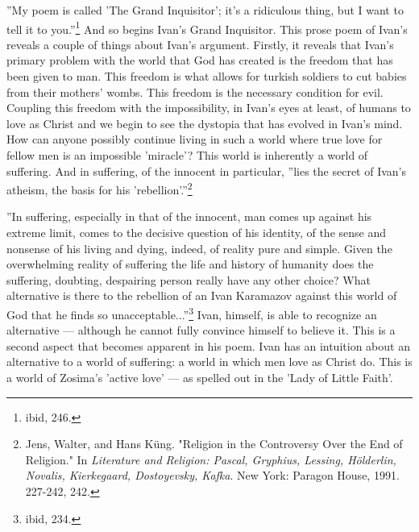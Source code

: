 ''My poem is called 'The Grand Inquisitor'; it's a ridiculous thing, but I want to tell it to you.''\footnote{ibid, 246.} And so begins Ivan's Grand Inquisitor. This prose poem of Ivan's reveals a couple of things about Ivan's argument. Firstly, it reveals that Ivan's primary problem with the world that God has created is the freedom that has been given to man. This freedom is what allows for turkish soldiers to cut babies from their mothers' wombs. This freedom is the necessary condition for evil. Coupling this freedom with the impossibility, in Ivan's eyes at least, of humans to love as Christ and we begin to see the dystopia that has evolved in Ivan's mind. How can anyone possibly continue living in such a world where true love for fellow men is an impossible 'miracle'? This world is inherently a world of suffering. And in suffering, of the innocent in particular, ''lies the secret of Ivan's atheism, the basis for his 'rebellion'.''\footnote{Jens, Walter, and Hans Küng. "Religion in the Controversy Over the End of Religion." In \emph{Literature and Religion: Pascal, Gryphius, Lessing, Hölderlin, Novalis, Kierkegaard, Dostoyevsky, Kafka}. New York: Paragon House, 1991. 227-242, 242.}

''In suffering, especially in that of the innocent, man comes up against his extreme limit, comes to the decisive question of his identity, of the sense and nonsense of his living and dying, indeed, of reality pure and simple. Given the overwhelming reality of suffering the life and history of humanity does the suffering, doubting, despairing person really have any other choice? What alternative is there to the rebellion of an Ivan Karamazov against this world of God that he finds so unacceptable...''\footnote{ibid, 234.} Ivan, himself, is able to recognize an alternative --- although he cannot fully convince himself to believe it. This is a second aspect that becomes apparent in his poem. Ivan has an intuition about an alternative to a world of suffering: a world in which men love as Christ do. This is a world of Zosima's 'active love' --- as spelled out in the 'Lady of Little Faith'.

